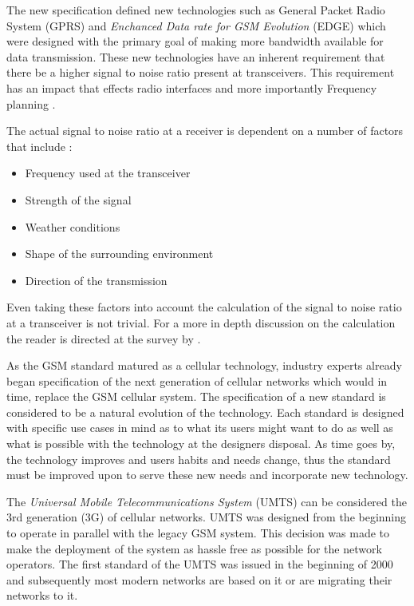 The new specification defined new technologies such as General Packet Radio System (GPRS) and \emph{Enchanced Data rate for GSM Evolution} (EDGE) which were designed with the primary goal of making more bandwidth available for data transmission.
These new technologies have an inherent requirement that there be a higher signal to noise ratio present at transceivers. This requirement has an impact that effects radio interfaces and more 
importantly Frequency planning \cite{Eisenblatter}. 

The actual signal to noise ratio at a receiver is dependent on a number of factors that include \cite{Karen2004}:
\begin{itemize}
\item Frequency used at the transceiver
\item Strength of the signal
\item Weather conditions
\item Shape of the surrounding environment
\item Direction of the transmission
\end{itemize}
Even taking these factors into account the calculation of the signal to noise ratio at a transceiver is not trivial. For a more in depth discussion on the calculation the reader is directed at the survey by \cite{Karen2004}.

As the GSM standard matured as a cellular technology, industry experts already began specification of the next generation of cellular networks which would in time, replace the GSM cellular system. The specification of a new standard is considered to be a natural evolution of the technology. Each standard is designed with specific use cases in mind as to what its users might want to do as well as what is possible with the technology at the designers disposal. As time goes by, the technology improves and users habits and needs change, thus the standard must be improved upon to serve these new needs and incorporate new technology.

The \emph{Universal Mobile Telecommunications System} (UMTS) can be considered the 3rd generation (3G) of cellular networks. UMTS was designed from the beginning to operate in parallel with the legacy GSM system. This decision was made to make the deployment of the system as hassle free as possible for the network operators. The first standard of the UMTS was issued in the beginning of 2000 and subsequently most modern networks are based on it or are migrating their networks to it.

